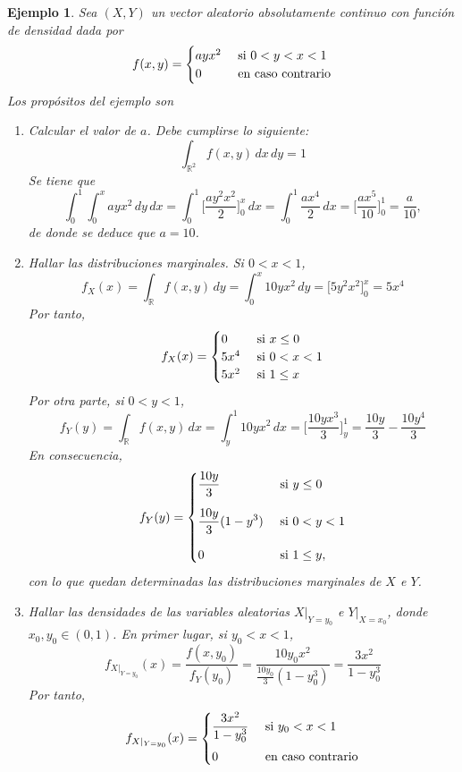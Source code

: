 \documentclass[11pt]{report}
\theoremstyle{mytheorem}
\theoremstyle{mydefinition}
\theoremstyle{myexample}
\newtheorem*{example}{Ejemplo}
\newcommand{\R}{\mathbb R}
\begin{document}
\begin{example}
Sea $(X,Y)$ un vector aleatorio absolutamente continuo con función de densidad dada por
\[f(x,y) = \begin{cases}
    ayx^2 & $ si$ \ 0<y<x<1 \\
    0 & $ en caso contrario$
\end{cases}\]
Los propósitos del ejemplo son
\begin{enumerate}
    \item \textit{Calcular el valor de $a$}. Debe cumplirse lo siguiente:
    \[\int_{\R^2}f(x,y)\,dx\,dy = 1\]
    Se tiene que
    \[\int_0^1\int_0^xayx^2\,dy\,dx = \int_0^1\biggl[\frac{ay^2x^2}{2}\biggr]_0^x\,dx = \int_0^1 \frac{ax^4}{2} \, dx = \biggl[\frac{ax^5}{10}\biggr]_0^1 = \frac{a}{10},\]
    de donde se deduce que $a = 10$.
    \item \textit{Hallar las distribuciones marginales}. Si $0 < x < 1$,
    \[f_X(x) = \int_\R f(x,y)\,dy = \int_0^x 10yx^2 \, dy =\biggl[5y^2x^2\biggr]_0^x= 5x^4\]
    Por tanto,
    \[f_X(x) = \begin{cases}
        0 & $ si $ x \leq 0 \\
        5x^4 & $ si $ 0 < x < 1 \\
        5x^2 & $ si $ 1 \leq x
    \end{cases}\]
    Por otra parte, si $0 < y < 1$,
    \[f_Y(y) = \int_\R f(x,y)\,dx = \int_y^1 10yx^2 \, dx =\bigg[\frac{10yx^3}{3}\biggr]_y^1 = \frac{10y}{3}-\frac{10y^4}{3}\]
    En consecuencia,
    \[f_Y(y) = \begin{cases}
        \displaystyle{\frac{10y}{3}} & $ si $ y \leq 0 \\[12.5pt]
        \displaystyle{\frac{10y}{3}(1-y^3)} & $ si $ 0 < y < 1 \\[12.5pt]
        0\phantom{\frac{1}{1}} & $ si $ 1 \leq y,
    \end{cases}\]
    con lo que quedan determinadas las distribuciones marginales de $X$ e $Y$.
    \item \textit{Hallar las densidades de las variables aleatorias $X |_{Y=y_0}$ e $Y |_{X = x_0}$, donde $x_0,y_0 \in (0,1)$}. En primer lugar, si $y_0 < x < 1$,
    \[f_{X|_{Y=y_0}}(x) = \frac{f(x,y_0)}{f_Y(y_0)} = \frac{10y_0x^2}{\frac{10y_0}{3}(1-y_0^3)} = \frac{3x^2}{1-y_0^3}\]
    Por tanto,
    \[f_{X|_{Y=y_0}}(x) = \begin{cases}
    \displaystyle{\frac{3x^2}{1-y_0^3}} & $ si $ y_0 < x < 1 \\[10pt]
    0 & $ en caso contrario$
    \end{cases}\]

\end{enumerate}
\end{example}
\end{document}
